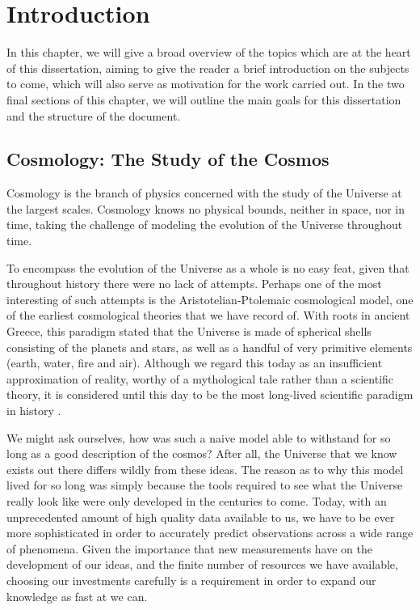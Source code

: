 \chapter{Introduction}
\label{chap:introduction}

In this chapter, we will give a broad overview of the topics which are at the heart of this dissertation, aiming to give the reader a brief introduction on the subjects to come, which will also serve as motivation for the work carried out. In the two final sections of this chapter, we will outline the main goals for this dissertation and the structure of the document.


\section{Cosmology: The Study of the Cosmos}
\label{sec:cosmology}

Cosmology is the branch of physics concerned with the study of the Universe at the largest scales. Cosmology knows no physical bounds, neither in space, nor in time, taking the challenge of modeling the evolution of the Universe throughout time.

To encompass the evolution of the Universe as a whole is no easy feat, given that throughout history there were no lack of attempts. Perhaps one of the most interesting of such attempts is the Aristotelian-Ptolemaic cosmological model, one of the earliest cosmological theories that we have record of. With roots in ancient Greece, this paradigm stated that the Universe is made of spherical shells consisting of the planets and stars, as well as a handful of very primitive elements (earth, water, fire and air). Although we regard this today as an insufficient approximation of reality, worthy of a mythological tale rather than a scientific theory, it is considered until this day to be the most long-lived scientific paradigm in history \cite{MGCosmology2021}.

We might ask ourselves, how was such a naive model able to withstand for so long as a good description of the cosmos? After all, the Universe that we know exists out there differs wildly from these ideas. The reason as to why this model lived for so long was simply because the tools required to see what the Universe really look like were only developed in the centuries to come. Today, with an unprecedented amount of high quality data available to us, we have to be ever more sophisticated in order to accurately predict observations across a wide range of phenomena. Given the importance that new measurements have on the development of our ideas, and the finite number of resources we have available, choosing our investments carefully is a requirement in order to expand our knowledge as fast at we can.


